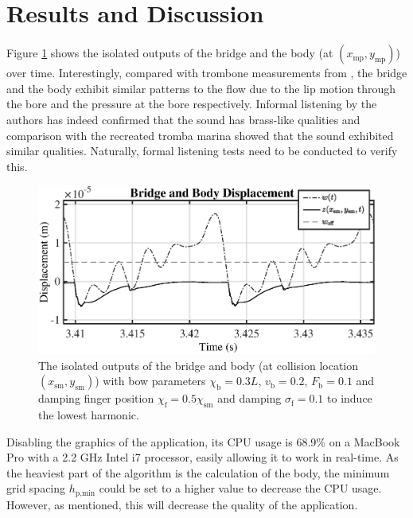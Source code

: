 \documentclass[dvipsnames, pdftex]{article}
\def\stringx{\chi}
\begin{document}
\section{Results and Discussion}\label{sec:resDisc}
Figure \ref{fig:waveforms} shows the isolated outputs of the bridge and the body (at $(x_\text{mp},y_\text{mp})$) over time. %
Interestingly, compared with trombone measurements from \cite[Figure 6]{Boutin2015:SMC2020}, the bridge and the body exhibit similar patterns to the flow due to the lip motion through the bore and the pressure at the bore respectively. Informal listening by the authors has indeed confirmed that the sound has brass-like qualities and comparison with the recreated tromba marina showed that the sound exhibited similar qualities. Naturally, formal listening tests need to be conducted to verify this. 
\begin{figure}[t]
  \centering
  \includegraphics[width=\columnwidth]{trombaWaveforms2.eps}
  \caption{The isolated outputs of the bridge and body (at collision location $(x_\text{sm},y_\text{sm})$) with bow parameters $\stringx_\text{b} = 0.3L$, $v_\text{b} = 0.2$, $F_\text{b} = 0.1$ and damping finger position $\stringx_\text{f} = 0.5\stringx_\text{sm}$ and damping $\sigma_\text{f} = 0.1$ to induce the lowest harmonic.}
  \label{fig:waveforms}
\end{figure}

Disabling the graphics of the application, its CPU usage is 68.9\% on a MacBook Pro with a 2.2 GHz Intel i7 processor, easily allowing it to work in real-time. As the heaviest part of the algorithm is the calculation of the body, the minimum grid spacing $h_{\text{p},\text{min}}$ could be set to a higher value to decrease the CPU usage. However, as mentioned, this will decrease the quality of the application.
\end{document}
